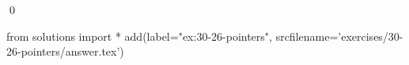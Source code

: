 
\begin{ex}
  \label{ex:30-26-pointers}
  
  \qed
\end{ex}
\begin{python0}
from solutions import *
add(label="ex:30-26-pointers",
    srcfilename='exercises/30-26-pointers/answer.tex')
\end{python0}
